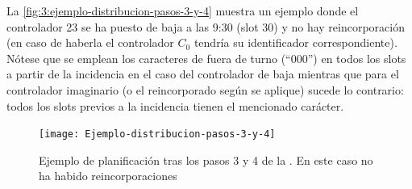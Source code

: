 La \autoref{fig:3:ejemplo-distribucion-pasos-3-y-4} muestra un ejemplo donde el controlador 23 se ha puesto de baja a las 9:30 (slot 30) y no hay reincorporación (en caso de haberla el controlador $C_0$ tendría su identificador correspondiente). Nótese que se emplean los caracteres de fuera de turno (``000'') en todos los slots a partir de la incidencia en el caso del controlador de baja mientras que para el controlador imaginario (o el reincorporado según se aplique) sucede lo contrario: todos los slots previos a la incidencia tienen el mencionado carácter. 

\begin{figure}[htbp]
	\centering
	\texttt{[image: Ejemplo-distribucion-pasos-3-y-4]}
	\caption[Ejemplo de planificación tras los pasos 3 y 4 de la \faseuno{}]{Ejemplo de planificación tras los pasos 3 y 4 de la \faseuno{}. En este caso no ha habido reincorporaciones}
	\label{fig:3:ejemplo-distribucion-pasos-3-y-4}
\end{figure}
%
%
%